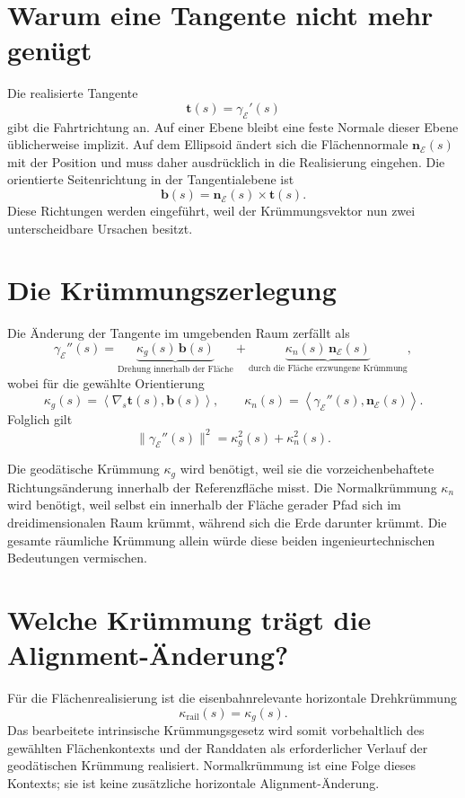 \section{Warum eine Tangente nicht mehr genügt}

Die realisierte Tangente
\[
\mathbf t(s)=\gamma_{\mathcal E}'(s)
\]
gibt die Fahrtrichtung an. Auf einer Ebene bleibt eine feste Normale dieser
Ebene üblicherweise implizit. Auf dem Ellipsoid ändert sich die
Flächennormale \(\mathbf n_{\mathcal E}(s)\) mit der Position und muss daher
ausdrücklich in die Realisierung eingehen. Die orientierte Seitenrichtung in
der Tangentialebene ist
\[
\mathbf b(s)=\mathbf n_{\mathcal E}(s)\times\mathbf t(s).
\]
Diese Richtungen werden eingeführt, weil der Krümmungsvektor nun zwei
unterscheidbare Ursachen besitzt.

\section{Die Krümmungszerlegung}

Die Änderung der Tangente im umgebenden Raum zerfällt als
\[
\gamma_{\mathcal E}''(s)
=
\underbrace{\kappa_g(s)\,\mathbf b(s)}_{
\text{Drehung innerhalb der Fläche}}
+
\underbrace{\kappa_n(s)\,\mathbf n_{\mathcal E}(s)}_{
\text{durch die Fläche erzwungene Krümmung}},
\]
wobei für die gewählte Orientierung
\[
\kappa_g(s)=
\left\langle\nabla_s\mathbf t(s),\mathbf b(s)\right\rangle,
\qquad
\kappa_n(s)=
\left\langle\gamma_{\mathcal E}''(s),
\mathbf n_{\mathcal E}(s)\right\rangle.
\]
Folglich gilt
\[
\lVert\gamma_{\mathcal E}''(s)\rVert^2
=\kappa_g^2(s)+\kappa_n^2(s).
\]

Die geodätische Krümmung \(\kappa_g\) wird benötigt, weil sie die
vorzeichenbehaftete Richtungsänderung innerhalb der Referenzfläche misst. Die
Normalkrümmung \(\kappa_n\) wird benötigt, weil selbst ein innerhalb der
Fläche gerader Pfad sich im dreidimensionalen Raum krümmt, während sich die
Erde darunter krümmt. Die gesamte räumliche Krümmung allein würde diese beiden
ingenieurtechnischen Bedeutungen vermischen.

\section{Welche Krümmung trägt die Alignment-Änderung?}

Für die Flächenrealisierung ist die eisenbahnrelevante horizontale
Drehkrümmung
\[
\kappa_{\mathrm{rail}}(s)=\kappa_g(s).
\]
Das bearbeitete intrinsische Krümmungsgesetz wird somit vorbehaltlich des
gewählten Flächenkontexts und der Randdaten als erforderlicher Verlauf der
geodätischen Krümmung realisiert. Normalkrümmung ist eine Folge dieses
Kontexts; sie ist keine zusätzliche horizontale Alignment-Änderung.

